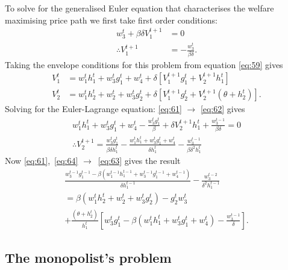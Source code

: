 To solve for the generalised Euler equation that characterises the
welfare maximising price path we first take first order conditions:
\begin{align}\label{eq:60}
  w^t_3 + \beta\delta V^{t+1}_1  &= 0 \\
  \label{eq:61} \therefore V^{t+1}_1 &= -\frac{w^t_3}{\beta\delta}.
\end{align}
Taking the envelope conditions for this problem from equation
\eqref{eq:59} gives
\begin{align}
  \label{eq:62} V^t_1 &= w^t_1h^t_1 + w^t_3g^t_1 + w^t_4 + \delta
  \left[ V^{t+1}_1g^t_1 + V^{t+1}_2h^t_1 \right] \\ \label{eq:63}
  V^t_2 &= w^t_1h^t_2 + w^t_2 + w^t_3g^t_2 + \delta \left[
    V^{t+1}_1g^t_2 + V^{t+1}_2 \left( \theta + h^t_2 \right)\right].
\end{align}
Solving for the Euler-Lagrange equation: \eqref{eq:61}
$\rightarrow$ \eqref{eq:62} gives
\begin{gather}
  \label{eq:64} w^t_1h^t_1 + w^t_3g^t_1 + w^t_4 - \frac{w^t_3g^t_1}{\beta} + \delta
  V^{t+1}_2h^t_1 + \frac{w^{t-1}_3}{\beta\delta} = 0 \\ \label{eq:65}
  \therefore V^{t+1}_2 = \frac{w^t_3g^t_1}{\beta\delta h^t_1} -
  \frac{w^t_1h^t_1 + w^t_3g^t_1 + w^t_4}{\delta h^t_1} -
  \frac{w^{t-1}_3}{\beta\delta^2 h^t_1}
\end{gather} Now \eqref{eq:61},~\eqref{eq:64}
$\rightarrow$~\eqref{eq:63} gives the result
\begin{multline}
  \label{eq:66}
  \frac{w^{t-1}_3g^{t-1}_1 - \beta\left( w^{t-1}_1h^{t-1}_1 +
      w^{t-1}_3g^{t-1}_1 + w^{t-1}_4 \right)}{\delta h^{t-1}_1}  -
  \frac{w^{t-2}_3}{\delta^2 h^{t-1}_1} \\=
  \beta ( w^t_1h^t_2 + w^t_2 + w^t_3g^t_2 ) - g^t_2w^t_3 \\
  +\frac{\left( \theta + h^t_2 \right)}{h^t_1} \left[ w^t_3g^t_1 -
    \beta\left( w^t_1h^t_1 + w^t_3g^t_1 + w^t_4 \right) -
    \frac{w^{t-1}_3}{\delta} \right].
\end{multline}

\subsection{The monopolist's problem}
\label{sec:monopolists-problem-1}

